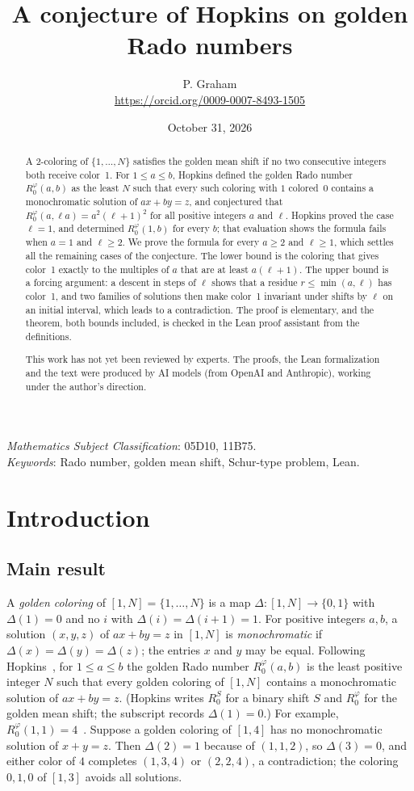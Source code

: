 \documentclass[11pt]{article}
\title{A conjecture of Hopkins on golden Rado numbers}
\author{P. Graham\\ \small\url{https://orcid.org/0009-0007-8493-1505}}
\date{October 31, 2026}
\theoremstyle{remark}
\newcommand{\Rg}{R_0^{\varphi}}
\begin{document}
\maketitle
\begin{abstract}
A 2-coloring of $\{1,\dots,N\}$ satisfies the golden mean shift if no two
consecutive integers both receive color~1. For $1\le a\le b$, Hopkins
defined the golden Rado number $\Rg(a,b)$ as the least $N$ such that
every such coloring with $1$ colored~$0$ contains a monochromatic
solution of $ax+by=z$, and conjectured that
$\Rg(a,\ell a)=a^2(\ell+1)^2$ for all positive integers $a$ and $\ell$.
Hopkins proved the case $\ell=1$, and determined $\Rg(1,b)$ for every
$b$; that evaluation shows the formula fails when $a=1$ and $\ell\ge2$.
We prove the formula for every $a\ge2$ and $\ell\ge1$, which settles all
the remaining cases of the conjecture. The lower bound is the coloring
that gives color~1 exactly to the multiples of $a$ that are at least
$a(\ell+1)$. The upper bound is a forcing argument: a descent in steps
of $\ell$ shows that a residue $r\le\min(a,\ell)$ has color~1, and two
families of solutions then make color~1 invariant under shifts by $\ell$
on an initial interval, which leads to a contradiction. The proof is
elementary, and the theorem, both bounds included, is checked in the
Lean proof assistant from the definitions.

This work has not yet been reviewed by experts. The proofs, the Lean
formalization and the text were produced by AI models (from OpenAI and
Anthropic), working under the author's direction.
\end{abstract}
\medskip

 \emph{Mathematics Subject Classification}: 05D10, 11B75.\\
\emph{Keywords}: Rado number, golden mean shift, Schur-type problem,
Lean.

\section{Introduction}

\subsection{Main result}
A \emph{golden coloring} of $[1,N]=\{1,\dots,N\}$ is a map
$\Delta:[1,N]\to\{0,1\}$ with $\Delta(1)=0$ and no $i$ with
$\Delta(i)=\Delta(i+1)=1$. For positive integers $a,b$, a solution
$(x,y,z)$ of $ax+by=z$ in $[1,N]$ is \emph{monochromatic} if
$\Delta(x)=\Delta(y)=\Delta(z)$; the entries $x$ and $y$ may be equal.
Following Hopkins~\cite[Definition~2]{Hopkins}, for $1\le a\le b$ the
golden Rado number $\Rg(a,b)$ is the least positive integer $N$ such
that every golden coloring of $[1,N]$ contains a monochromatic solution
of $ax+by=z$. (Hopkins writes $R_0^S$ for a binary shift $S$ and
$\Rg$ for the golden mean shift; the subscript records $\Delta(1)=0$.)
For example, $\Rg(1,1)=4$~\cite[Section~2]{Hopkins}. Suppose a golden
coloring of $[1,4]$ has no monochromatic solution of $x+y=z$. Then
$\Delta(2)=1$ because of $(1,1,2)$, so $\Delta(3)=0$, and either color
of $4$ completes $(1,3,4)$ or $(2,2,4)$, a contradiction; the coloring
$0,1,0$ of $[1,3]$ avoids all solutions.
\end{document}
